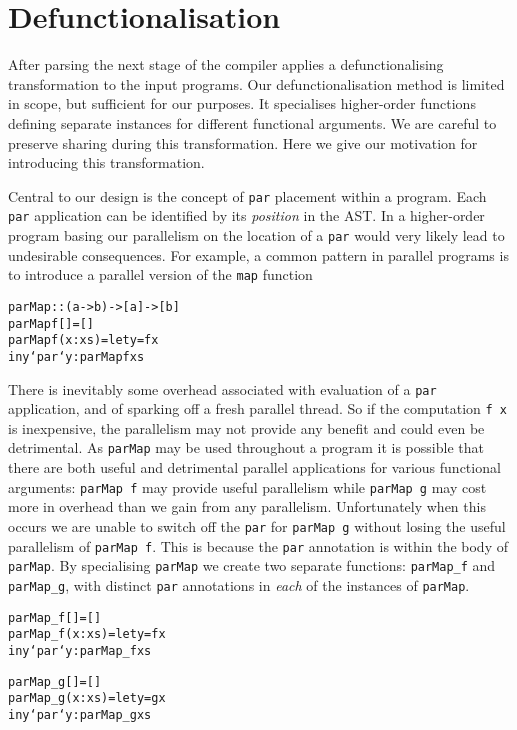 \section{Defunctionalisation}
\label{sec:defunct}

After parsing the next stage of the compiler applies a defunctionalising
transformation to the input programs. Our defunctionalisation method is limited
in scope, but sufficient for our purposes. It specialises higher-order
functions defining separate instances for different functional arguments. We
are careful to preserve sharing during this transformation. Here we give our
motivation for introducing this transformation.

Central to our design is the concept of \verb-par- placement within a program.
Each \verb-par- application can be identified by its \emph{position} in the
AST. In a higher-order program basing our parallelism on the location of a
\verb-par- would very likely lead to undesirable consequences. For example, a common pattern
in parallel programs is to introduce a parallel version of the \verb-map-
function

\begin{alltt}
    parMap :: (a -> b) -> [a] -> [b]
    parMap f []     = []
    parMap f (x:xs) = let y = f x
                      in y `par` y : parMap f xs
\end{alltt}

There is inevitably some overhead associated with evaluation of a \verb-par-
application, and of sparking off a fresh parallel thread.  So if the
computation \verb-f x- is inexpensive, the parallelism may not provide any
benefit and could even be detrimental. As \verb-parMap- may be used throughout
a program it is possible that there are both useful and detrimental parallel
applications for various functional arguments: \verb-parMap f- may provide
useful parallelism while \verb-parMap g- may cost more in overhead than we gain
from any parallelism.  Unfortunately when this occurs we are unable to switch
off the \verb-par- for \verb-parMap g- without losing the useful parallelism of
\verb-parMap f-. This is because the \verb-par- annotation is within the body
of \verb-parMap-. By specialising \verb-parMap- we create two separate
functions: \verb-parMap_f- and \verb-parMap_g-, with distinct \verb-par-
annotations in \emph{each} of the instances of \verb-parMap-.

\pagebreak

\begin{alltt}
    parMap_f []     = []
    parMap_f (x:xs) = let y = f x
                      in y `par` y : parMap_f xs

    parMap_g []     = []
    parMap_g (x:xs) = let y = g x
                      in y `par` y : parMap_g xs
\end{alltt}


